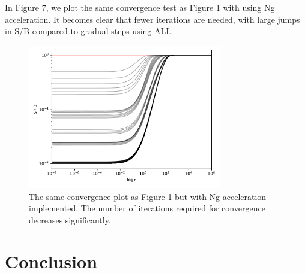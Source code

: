 \documentclass[12pt]{article}
\begin{document}
In Figure 7, we plot the same convergence test as Figure 1 with using Ng acceleration. It becomes clear that fewer iterations are needed, with large jumps in S/B compared to gradual steps using ALI.

\begin{figure}[ht]
 \centering
 \includegraphics[width=0.75\textwidth]{doc/figs/S_B_convergence.pdf}
 \caption{The same convergence plot as Figure 1 but with Ng acceleration implemented. The number of iterations required for convergence decreases significantly.}
\end{figure}


\section{Conclusion}




\end{document}
